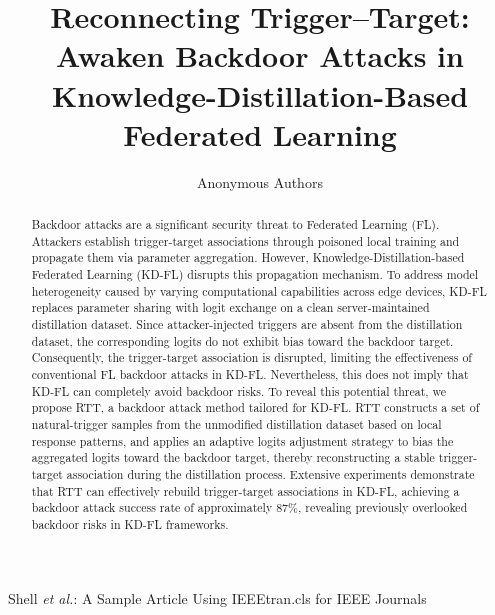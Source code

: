 \documentclass[lettersize,journal]{IEEEtran}
\begin{document}
\title{Reconnecting Trigger–Target: Awaken Backdoor Attacks in Knowledge-Distillation-Based \\ Federated Learning}

\author{Anonymous Authors\vspace{2.0em}}

%
{Shell \MakeLowercase{\textit{et al.}}: A Sample Article Using IEEEtran.cls for IEEE Journals}


\maketitle

\begin{abstract}
Backdoor attacks are a significant security threat to Federated Learning (FL).
Attackers establish trigger-target associations through poisoned local training and propagate them via parameter aggregation.
However, Knowledge-Distillation-based Federated Learning (KD-FL) disrupts this propagation mechanism.
To address model heterogeneity caused by varying computational capabilities across edge devices, KD-FL replaces parameter sharing with logit exchange on a clean server-maintained distillation dataset.
Since attacker-injected triggers are absent from the distillation dataset, the corresponding logits do not exhibit bias toward the backdoor target.
Consequently, the trigger-target association is disrupted, limiting the effectiveness of conventional FL backdoor attacks in KD-FL.
Nevertheless, this does not imply that KD-FL can completely avoid backdoor risks.
To reveal this potential threat, we propose RTT, a backdoor attack method tailored for KD-FL. 
RTT constructs a set of natural-trigger samples from the unmodified distillation dataset based on local response patterns, and applies an adaptive logits adjustment strategy to bias the aggregated logits toward the backdoor target, thereby reconstructing a stable trigger-target association during the distillation process.
Extensive experiments demonstrate that RTT can effectively rebuild trigger-target associations in KD-FL, achieving a backdoor attack success rate of approximately 87\%, revealing previously overlooked backdoor risks in KD-FL frameworks.
\end{abstract}
\end{document}
